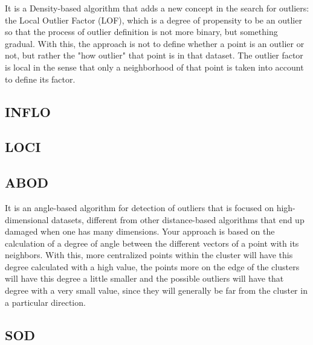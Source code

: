 It is a Density-based algorithm that adds a new concept in the search for outliers: the 
Local Outlier Factor (LOF), which is a degree of propensity to be an outlier so that the 
process of outlier definition is not more binary, but something gradual. With this, the 
approach is not to define whether a point is an outlier or not, but rather the "how outlier"
that point is in that dataset. The outlier factor is local in the sense that only a neighborhood
of that point is taken into account to define its factor.

\subsection{INFLO}
\subsection{LOCI}
\subsection{ABOD}

It is an angle-based algorithm for detection of outliers that is focused on high-dimensional
datasets, different from other distance-based algorithms that end up damaged when one has 
many dimensions. Your approach is based on the calculation of a degree of angle between the 
different vectors of a point with its neighbors. With this, more centralized points within 
the cluster will have this degree calculated with a high value, the points more on the edge 
of the clusters will have this degree a little smaller and the possible outliers will have 
that degree with a very small value, since they will generally be far from the cluster in a 
particular direction.

\subsection{SOD}

